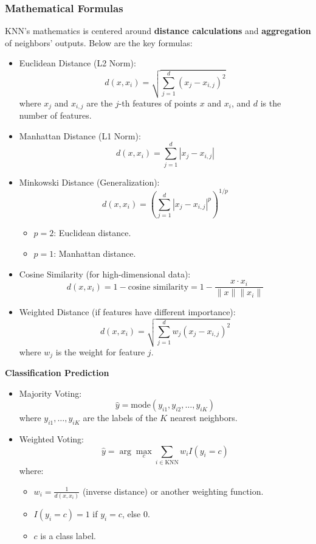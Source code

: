 \subsubsection{Mathematical Formulas}\text{}

\smallskip
KNN's mathematics is centered around \textbf{distance calculations} and \textbf{aggregation} of neighbors' outputs.
Below are the key formulas:

\begin{itemize}
    \item Euclidean Distance (L2 Norm):
    \[d(x, x_i) = \sqrt{\sum_{j=1}^d (x_j - x_{i,j})^2}\]
    where $x_j$ and $x_{i,j}$ are the $j$-th features of points $x$ and $x_i$, and $d$ is the number of features.

    \item Manhattan Distance (L1 Norm):
    \[d(x, x_i) = \sum_{j=1}^d |x_j - x_{i,j}|\]

    \item Minkowski Distance (Generalization):
    \[d(x, x_i) = \left( \sum_{j=1}^d |x_j - x_{i,j}|^p \right)^{1/p}\]

    \begin{itemize}
        \item $p = 2$: Euclidean distance.
        \item $p = 1$: Manhattan distance.
    \end{itemize}

    \item Cosine Similarity (for high-dimensional data):
    \[d(x, x_i) = 1 - \text{cosine similarity} = 1 - \frac{x \cdot x_i}{\|x\| \|x_i\|}\]

    \item Weighted Distance (if features have different importance):
    \[d(x, x_i) = \sqrt{\sum_{j=1}^d w_j (x_j - x_{i,j})^2}\]
    where $w_j$ is the weight for feature $j$.
\end{itemize}

\smallskip
\textbf{Classification Prediction}

\begin{itemize}
    \item Majority Voting:
    \[\hat{y} = \text{mode}(y_{i1}, y_{i2}, \dots, y_{iK})\]
    where $y_{i1}, \dots, y_{iK}$ are the labels of the $K$ nearest neighbors.

    \item Weighted Voting:
    \[\hat{y} = \arg\max_c \sum_{i \in \text{KNN}} w_i I(y_i = c)\]
    where:
    \begin{itemize}
        \item $w_i = \frac{1}{d(x, x_i)}$ (inverse distance) or another weighting function.
        \item $I(y_i = c) = 1$ if $y_i = c$, else 0.
        \item $c$ is a class label.
    \end{itemize}
\end{itemize}

